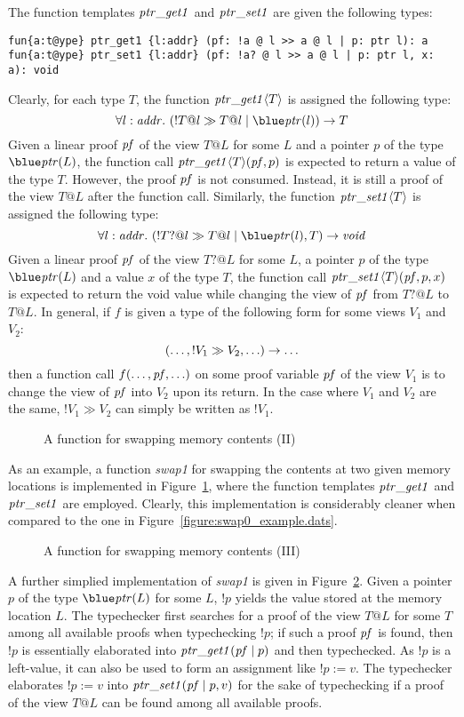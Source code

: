 The function templates ${\it ptr\_get1}$ and ${\it ptr\_set1}$ are given
the following types:
\begin{verbatim}
fun{a:t@ype} ptr_get1 {l:addr} (pf: !a @ l >> a @ l | p: ptr l): a
fun{a:t@ype} ptr_set1 {l:addr} (pf: !a? @ l >> a @ l | p: ptr l, x: a): void
\end{verbatim}
Clearly, for each type $T$, the function
${\it ptr\_get1}\langle T\rangle$ is assigned the following type:
\[
\forall l:\saddr.~(!T@l \gg T@l \mid \tptr(l))\timp T
\]
Given a linear proof ${\it pf}$ of the view $T@L$ for some $L$ and a
pointer $p$ of the type $\tptr(L)$, the function call ${\it
ptr\_get1}\langle T\rangle({\it pf}, p)$ is expected to return a
value of the type $T$. However, the proof ${\it pf}$ is not
consumed. Instead, it is still a proof of the view $T@L$ after the function
call. Similarly, the function
${\it ptr\_set1}\langle T\rangle$ is assigned the following type:
\[
\forall l:\saddr.~(!T?@l \gg T@l \mid \tptr(l), T)\timp\tvoid
\]
Given a linear proof ${\it pf}$ of the view $T?@L$ for some $L$, a pointer
$p$ of the type $\tptr(L)$ and a value $x$ of the type $T$, the function
call ${\it ptr\_set1}\langle T\rangle({\it pf}, p, x)$ is expected to
return the void value while changing the view of ${\it pf}$ from $T?@L$ to
$T@L$.  In general, if $f$ is given a type of the following form for some
views $V_1$ and $V_2$: $$(\ldots,!V_1\gg V_2,\ldots)\rightarrow\ldots$$ then a
function call $f(\ldots,{\it pf},\ldots)$ on some proof variable ${\it pf}$
of the view $V_1$ is to change the view of ${\it pf}$ into $V_2$ upon its
return.  In the case where $V_1$ and $V_2$ are the same, $!V_1\gg V_2$ can
simply be written as $!V_1$.
\begin{figure}

\caption{A function for swapping memory contents (II)}
\label{figure:swap1_example.dats}
\end{figure}
As an example, a function {\it swap1} for swapping the contents at two
given memory locations is implemented in
Figure~\ref{figure:swap1_example.dats}, where the function templates ${\it
ptr\_get1}$ and ${\it ptr\_set1}$ are employed.  Clearly, this
implementation is considerably cleaner when compared to the one in
Figure~\ref{figure:swap0_example.dats}.

\begin{figure}

\caption{A function for swapping memory contents (III)}
\label{figure:swap1_alt_example.dats}
\end{figure}
A further simplied implementation of {\it swap1} is given in
Figure~\ref{figure:swap1_alt_example.dats}. Given a pointer $p$ of the type
$\tptr(L)$ for some $L$, $!p$ yields the value stored at the memory
location $L$.  The typechecker first searches for a proof of the view $T@L$
for some $T$ among all available proofs when typechecking $!p$; if such a
proof ${\it pf}$ is found, then $!p$ is essentially elaborated into ${\it
ptr\_get1}({\it pf} \mid p)$ and then typechecked. As $!p$ is a left-value,
it can also be used to form an assignment like $!p := v$. The typechecker
elaborates $!p := v$ into ${\it ptr\_set1}({\it pf} \mid p, v)$ for the
sake of typechecking if a proof of the view $T@L$ can be found among all
available proofs.

